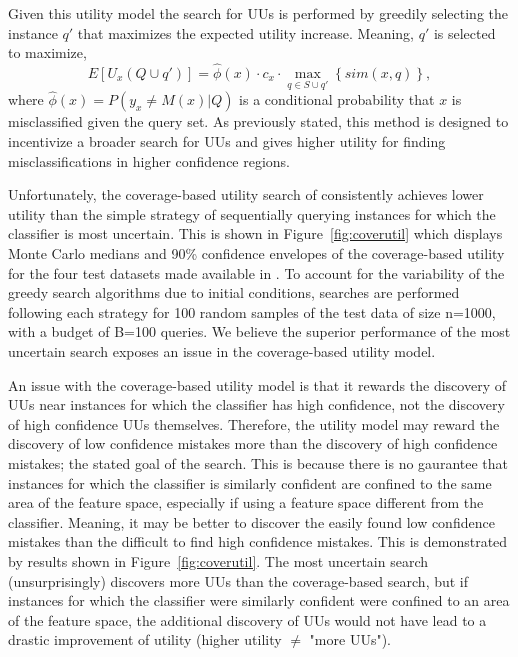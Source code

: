 \documentclass[letterpaper]{article} %
\newcommand{\wdb}[1]{{\color{blue} #1}} %
\begin{document}
Given this utility model the search for UUs is performed by greedily selecting the instance $q'$ that maximizes the expected utility increase.  Meaning, $q'$ is selected to maximize, $$E\left[U_x\left(Q \cup q'\right)\right] = \hat{\phi}(x) \cdot c_x \cdot \max_{q \in S \cup q'} \left\{sim\left(x,q \right) \right\},$$ where $\hat{\phi}(x) = P\left(y_x \neq M(x) |Q \right)$ is a conditional probability that $x$ is misclassified given the query set.  As previously stated, this method is designed to incentivize a broader search for UUs and gives higher utility for finding misclassifications in higher confidence regions.  

Unfortunately, the coverage-based utility search of \citet{Bansal2018} consistently achieves lower utility than the simple strategy of sequentially querying instances for which the classifier is most uncertain.  This is shown in Figure~\ref{fig:coverutil} which displays Monte Carlo medians and 90\% confidence envelopes of the coverage-based utility for the four test datasets made available in \citet{Bansal2018}.  To account for the variability of the greedy search algorithms due to initial conditions, searches are performed following each strategy for 100 random samples of the test data of size n=1000, with a budget of B=100 queries.  We believe the superior performance of the most uncertain search exposes an issue in the coverage-based utility model.  


An issue with the coverage-based utility model is that it rewards the discovery of UUs near instances for which the classifier has high confidence, not the discovery of high confidence UUs themselves.  Therefore, the utility model may reward the discovery of low confidence mistakes more than the discovery of high confidence mistakes; the stated goal of the search. This is because there is no gaurantee that instances for which the classifier is similarly confident are confined to the same area of the feature space, especially if using a feature space different from the classifier.  Meaning, it may be better to discover the easily found low confidence mistakes than the difficult to find high confidence mistakes. This is demonstrated by results shown in Figure~\ref{fig:coverutil}.  The most uncertain search (unsurprisingly) discovers more UUs than the coverage-based search, but if instances for which the classifier were similarly confident were confined to an area of the feature space, the additional discovery of UUs would not have lead to a drastic improvement of utility \wdb{(higher utility $\ne$ "more UUs")}.
\end{document}
